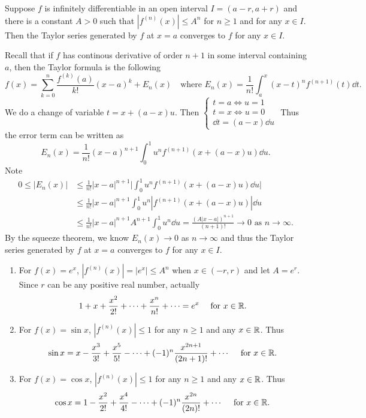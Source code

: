     \begin{theoremenv}
        Suppose $f$ is infinitely differentiable in an open interval $I = (a-r,a+r)$ and there is a constant $A>0$ such that $|f^{(n)}(x)| \le A^n$ for $n\ge 1$ and for any $x\in I$. Then the Taylor series generated by $f$ at $x=a$ converges to $f$ for any $x\in I$.
    \end{theoremenv}
    \begin{proofenv}
        Recall that if $f$ has continous derivative of order $n+1$ in some interval containing $a$, then the Taylor formula is the following
        $$
        f(x) = \sum_{k=0}^n \frac{f^{(k)}(a)}{k!} (x-a)^k + E_n(x) \quad \text{where } E_n(x) = \frac1{n!} \int_a^x (x-t)^n f^{(n+1)}(t) \dd t.
        $$
        We do a change of variable $t=x+(a-x)u$. Then $\displaystyle \begin{cases}
            t=a \Leftrightarrow u=1 \\
            t=x \Leftrightarrow u=0 \\
            \dd t = (a-x) \dd u
        \end{cases}
        $
        Thus the error term can be written as
        \[
        E_n(x) = \frac1{n!} (x-a)^{n+1} \int_0^1 u^n f^{(n+1)}(x+(a-x)u) \dd u.
        \]
        Note 
        $$
        \begin{aligned}
            0 \le |E_n(x)| &\le \frac{1}{n!}|x-a|^{n+1} \Big|\int_0^1 u^n f^{(n+1)}(x+(a-x)u) \dd u \Big|\\
            &\le \frac{1}{n!} |x-a|^{n+1}\int_0^1 u^n |f^{(n+1)}(x+(a-x)u)| \dd u\\
            &\le \frac{1}{n!}|x-a|^{n+1} A^{n+1} \int_0^1 u^n \dd u = \frac{(A|x-a|)^{n+1}}{(n+1)!} \to 0 \text{ as } n\to \infty.
        \end{aligned}
        $$
        By the squeeze theorem, we know $E_n(x) \to 0$ as $n\to \infty$ and thus the Taylor series generated by $f$ at $x=a$ converges to $f$ for any $x\in I$.
    \end{proofenv}
    \begin{exampleenv}
        \leavevmode
        \begin{enumerate}
            \item For $f(x) = e^x$,  $|f^{(n)}(x)| = |e^x|\le A^n$ when $x\in (-r,r)$ and let $A=e^r$. Since $r$ can be any positive real number, actually
            $$
            1+x+\frac{x^2}{2!}+\cdots + \frac{x^n}{n!} + \cdots = e^x \quad \text{ for } x \in \mathbb{R}.
            $$
            \item For $f(x) = \sin x$, $|f^{(n)}(x)| \le 1$ for any $n\ge 1$ and any $x\in \mathbb{R}$. Thus
            $$
            \sin x = x - \frac{x^3}{3!} + \frac{x^5}{5!} - \cdots + (-1)^n \frac{x^{2n+1}}{(2n+1)!} + \cdots \quad \text{ for } x\in \mathbb{R}.
            $$
            \item For $f(x) = \cos x$, $|f^{(n)}(x)| \le 1$ for any $n\ge 1$ and any $x\in \mathbb{R}$. Thus
            $$
            \cos x = 1 - \frac{x^2}{2!} + \frac{x^4}{4!} - \cdots + (-1)^n \frac{x^{2n}}{(2n)!} + \cdots \quad \text{ for } x\in \mathbb{R}.
            $$
        \end{enumerate}
    \end{exampleenv}
